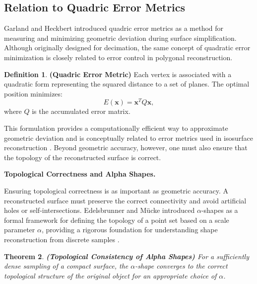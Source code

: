 \documentclass[12pt, a4paper, oneside]{book}
\theoremstyle{plain}
\newtheorem{theorem}{Theorem}[chapter]
\theoremstyle{definition}
\newtheorem{definition}[theorem]{Definition}
\theoremstyle{remark}
\theoremstyle{definition}
\begin{document}
\vspace{0.5em}

\subsection{Relation to Quadric Error Metrics}

Garland and Heckbert introduced quadric error metrics as a method for measuring and
minimizing geometric deviation during surface simplification. Although originally designed
for decimation, the same concept of quadratic error minimization is closely related to
error control in polygonal reconstruction.

\begin{definition}
    \textbf{(Quadric Error Metric)}
Each vertex is associated with a quadratic form representing the squared distance to a
set of planes. The optimal position minimizes:
\[
E(\mathbf{x}) = \mathbf{x}^T Q \mathbf{x},
\]
where $Q$ is the accumulated error matrix.
\end{definition}

This formulation provides a computationally efficient way to approximate geometric
deviation and is conceptually related to error metrics used in isosurface reconstruction
\cite{garland1997surface}. Beyond geometric accuracy, however, one must also ensure that
the topology of the reconstructed surface is correct.

\vspace{0.5em}

\textbf{Topological Correctness and Alpha Shapes.}

Ensuring topological correctness is as important as geometric accuracy. A reconstructed
surface must preserve the correct connectivity and avoid artificial holes or
self-intersections. Edelsbrunner and Mücke introduced $\alpha$-shapes as a formal
framework for defining the topology of a point set based on a scale parameter $\alpha$,
providing a rigorous foundation for understanding shape reconstruction from discrete
samples \cite{edelsbrunner1994three}.

\begin{theorem}
    \textbf{(Topological Consistency of Alpha Shapes)}
For a sufficiently dense sampling of a compact surface, the $\alpha$-shape converges to
the correct topological structure of the original object for an appropriate choice of
$\alpha$.
\end{theorem}

\vspace{0.5em}
\end{document}
